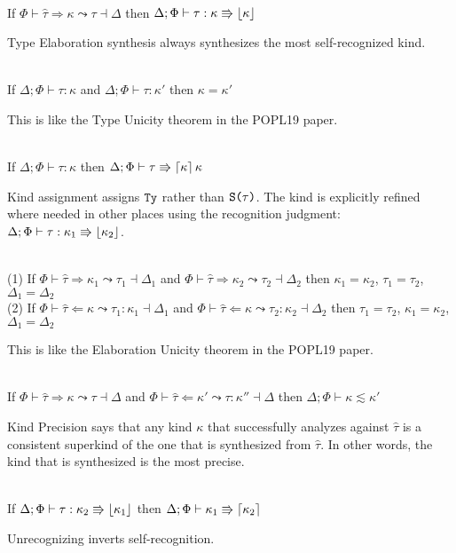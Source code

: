 \documentclass[12pt,letterpaper]{article}
\newcommand{\elabAna}[6]{#1 \vdash #2 \Leftarrow #3 \leadsto #4 : #5 \dashv #6}
\newcommand{\elabSyn}[5]{#1 \vdash #2 \Rightarrow #3 \leadsto #4 \dashv #5}
\newcommand{\kconsubkind}[3]{#1 \vdash #2 \lesssim #3}
\newcommand{\kindAssign}[3]{#1 \vdash #2 : #3}
\newcommand{\tauSelfRecognized}[4]{#1 \vdash #2 : #3 \Rrightarrow \floor{#4}}
\newcommand{\tauUnrecognize}[3]{#1 \vdash #2 \Rrightarrow \ceil{#3}}
\newcommand{\hPhi}{\Phi}
\newcommand{\htau}{\hat{\tau}}
\newcommand{\hkappa}{\kappa}
\newcommand{\dtau}{\tau}
\newcommand{\Ty}{\textt{Ty}}
\newcommand{\KSing}[1]{\textt{S(}#1{\textt{)}}}
\begin{document}
\begin{thm}\ \\
	If $\elabSyn{\hPhi}{\htau}{\hkappa}{\dtau}{\Delta}$ then $\tauSelfRecognized{\Delta;\hPhi}{\dtau}{\hkappa}{\hkappa}$
\end{thm}
\noindent
Type Elaboration synthesis always synthesizes the most self-recognized kind.

\begin{thm}\ \\
	If $\kindAssign{\Delta;\hPhi}{\dtau}{\hkappa}$ and $\kindAssign{\Delta;\hPhi}{\dtau}{\hkappa'}$ then $\hkappa = \hkappa'$
\end{thm}
\noindent
This is like the Type Unicity theorem in the POPL19 paper.

\begin{thm}\ \\
	If $\kindAssign{\Delta;\hPhi}{\dtau}{\hkappa}$ then $\tauUnrecognize{\Delta;\hPhi}{\dtau}{\hkappa}{\hkappa}$
\end{thm}
\noindent
Kind assignment assigns $\Ty$ rather than $\KSing{\dtau}$. The kind is explicitly refined where needed in other places using the recognition judgment: $\tauSelfRecognized{\Delta;\hPhi}{\dtau}{\hkappa_1}{\hkappa_2}$.


\begin{thm}\ \\
	(1) If $\elabSyn{\hPhi}{\htau}{\hkappa_1}{\dtau_1}{\Delta_1}$ and $\elabSyn{\hPhi}{\htau}{\hkappa_2}{\dtau_2}{\Delta_2}$ then $\hkappa_1 = \hkappa_2$, $\dtau_1 = \dtau_2$, $\Delta_1 = \Delta_2$ \\
	(2) If $\elabAna{\hPhi}{\htau}{\hkappa}{\dtau_1}{\hkappa_1}{\Delta_1}$ and $\elabAna{\hPhi}{\htau}{\hkappa}{\dtau_2}{\hkappa_2}{\Delta_2}$ then $\dtau_1 = \dtau_2$, $\hkappa_1 = \hkappa_2$, $\Delta_1 = \Delta_2$
\end{thm}
\noindent
This is like the Elaboration Unicity theorem in the POPL19 paper.



\begin{thm}\ \\
	If $\elabSyn{\hPhi}{\htau}{\hkappa}{\dtau}{\Delta}$ and $\elabAna{\hPhi}{\htau}{\hkappa'}{\dtau}{\hkappa''}{\Delta}$ then $\kconsubkind{\Delta;\hPhi}{\hkappa}{\hkappa'}$
\end{thm}

\noindent
Kind Precision says that any kind $\hkappa$ that successfully analyzes against $\htau$ is a consistent superkind of the one that is synthesized from $\htau$. In other words, the kind that is synthesized is the most precise.


\begin{thm}\ \\
	If $\tauSelfRecognized{\Delta;\hPhi}{\dtau}{\hkappa_2}{\hkappa_1}$ then $\tauUnrecognize{\Delta;\hPhi}{\hkappa_1}{\hkappa_2}$
\end{thm}

\noindent
Unrecognizing inverts self-recognition.
\end{document}
